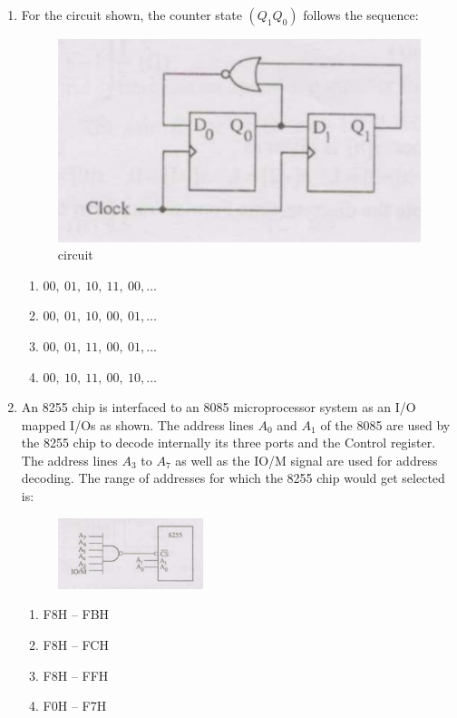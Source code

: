 \documentclass[journal,12pt,onecolumn]{IEEEtran}
\theoremstyle{remark}
\begin{document}
\begin{enumerate}
\item For the circuit shown, the counter state $(Q_1 Q_0)$ follows the sequence:

\begin{figure}[H]
    \centering
    \includegraphics[width=0.4\linewidth]{Q45.jpg}
    \caption{circuit}
    \label{fig:full_wave}
\end{figure}

\hfill{}
\begin{enumerate}
  \item $00,\ 01,\ 10,\ 11,\ 00,\dots$
  \item $00,\ 01,\ 10,\ 00,\ 01,\dots$
  \item $00,\ 01,\ 11,\ 00,\ 01,\dots$
  \item $00,\ 10,\ 11,\ 00,\ 10,\dots$
\end{enumerate}

\item An 8255 chip is interfaced to an 8085 microprocessor system as an I/O mapped I/Os as shown. The address lines $A_0$ and $A_1$ of the 8085 are used by the 8255 chip to decode internally its three ports and the Control register. The address lines $A_3$ to $A_7$ as well as the IO/M signal are used for address decoding. The range of addresses for which the 8255 chip would get selected is: 

\begin{figure}[ht!]
    \centering
    \includegraphics[width=0.4\textwidth]{Q46.jpg}
    \caption{}
    \label{fig:Q46.jpg}
\end{figure}

\hfill{}
\begin{enumerate}
  \item F8H -- FBH
  \item F8H -- FCH
  \item F8H -- FFH
  \item F0H -- F7H
\end{enumerate}


\end{enumerate}
\end{document}
